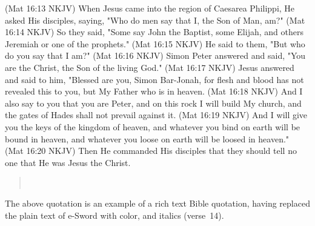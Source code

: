 \documentclass{article}
\begin{document}
\begin{declareBVs}
\BV(Mat 16:13 NKJV) When Jesus came into the region of Caesarea Philippi,
    He asked His disciples, saying, "Who do men say that I, the Son of Man, am?"\null
\BV(Mat 16:14 NKJV) So they said, "Some say John the Baptist, some Elijah,
    and others Jeremiah or one of the prophets."\null
\BV(Mat 16:15 NKJV) He said to them, "But who do you say that I am?"\null
\BV(Mat 16:16 NKJV) Simon Peter answered and said, "You are the Christ, the Son of the living God."\null
\BV(Mat 16:17 NKJV) Jesus answered and said to him, "Blessed are you, Simon Bar-Jonah,
    for flesh and blood has not revealed this to you, but My Father who is in heaven.\null
\BV(Mat 16:18 NKJV) And I also say to you that you are Peter,
    and on this rock I will build My church, and the gates of Hades shall not prevail against it.\null
\BV(Mat 16:19 NKJV) And I will give you the keys of the kingdom of heaven,
    and whatever you bind on earth will be bound in heaven, and whatever you loose on earth will be loosed in heaven."\null
\BV(Mat 16:20 NKJV) Then He commanded His disciples that
    they should tell no one that He was Jesus the Christ.\null
\end{declareBVs}

\begin{quote}\sloppy
{}\\[3pt]
\renewcommand\verseFmt[1]{{\normalcolor\verseFmtDef{#1}}}
\noindent{}
\end{quote}
The above quotation is an example of a rich text Bible quotation, having replaced
the plain text of \textsf{e-Sword} with color, and italics (verse~14).
\end{document}
